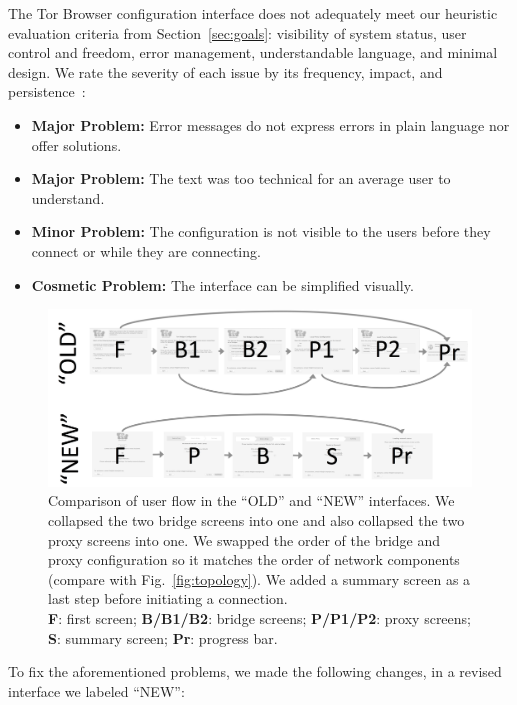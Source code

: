 \documentclass[USenglish,oneside,twocolumn]{article}
\begin{document}
The Tor Browser configuration interface does not adequately meet our heuristic evaluation criteria from Section~\ref{sec:goals}: visibility of system status, user control and freedom, error management, understandable language, and minimal design. We rate the severity of each issue by its frequency, impact, and persistence~\cite{nielsen1994heuristic}:\\

\begin{itemize}
\item {\bfseries Major Problem:} Error messages do not express errors in plain language nor offer solutions. 
\item {\bfseries Major Problem:} The text was too technical for an average user to understand. 
\item {\bfseries Minor Problem:} The configuration is not visible to the users before they connect or while they are connecting.
\item {\bfseries Cosmetic Problem:} The interface can be simplified visually. 
 \end{itemize} 
 
 \label{redesign}
\begin{figure}[t]
\centering
\includegraphics[width=.85\textwidth]{old-and-new-flows.png}
\caption{
Comparison of user flow in the ``OLD'' and ``NEW'' interfaces.
We collapsed the two bridge screens into one 
and also collapsed the two proxy screens into one.
We swapped the order of the bridge and proxy configuration
so it matches the order of network components (compare with Fig.~\ref{fig:topology}).
We added a summary screen as a last step before initiating a connection.\\
\textbf{F}: first screen;
\textbf{B/B1/B2}: bridge screens;
\textbf{P/P1/P2}: proxy screens;
\textbf{S}: summary screen;
\textbf{Pr}: progress bar.
}
\label{fig:flow}
\end{figure} 

To fix the aforementioned problems, we made the following changes,
in a revised interface we labeled ``NEW'': \\
\end{document}
